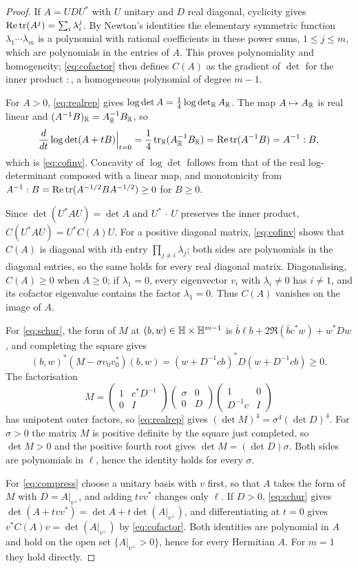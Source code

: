 \begin{proof}
If $A=UDU^*$ with $U$ unitary and $D$ real diagonal, cyclicity gives
$\operatorname{Re}\operatorname{tr}(A^j)=\sum_i\lambda_i^j$. By Newton's identities the elementary symmetric function
$\lambda_1\cdots\lambda_m$ is a polynomial with rational coefficients in these power sums,
$1\le j\le m$, which are polynomials in the entries of $A$. This proves polynomiality and
homogeneity; \eqref{eq:cofactor} then defines $C(A)$ as the gradient of $\det$ for the inner
product $:$, a homogeneous polynomial of degree $m-1$.

For $A>0$, \eqref{eq:realrep} gives $\log\det A=\frac14\log\det_{\mathbb{R}}A_{\mathbb{R}}$. The map $A\mapsto
A_{\mathbb{R}}$ is real linear and $(A^{-1}B)_{\mathbb{R}}=A_{\mathbb{R}}^{-1}B_{\mathbb{R}}$, so
\[
\frac{d}{dt}\log\det(A+tB)\Big|_{t=0}=\frac14\operatorname{tr}_{\mathbb{R}}(A_{\mathbb{R}}^{-1}B_{\mathbb{R}})=\operatorname{Re}\operatorname{tr}(A^{-1}B)=A^{-1}:B ,
\]
which is \eqref{eq:cofinv}. Concavity of $\log\det$ follows from that of the real
log-determinant composed with a linear map, and monotonicity from
$A^{-1}:B=\operatorname{Re}\operatorname{tr}(A^{-1/2}BA^{-1/2})\ge0$ for $B\ge0$.

Since $\det(U^*AU)=\det A$ and $U^*\,\cdot\,U$ preserves the inner product, $C(U^*AU)=U^*C(A)U$.
For a positive diagonal matrix, \eqref{eq:cofinv} shows that $C(A)$ is diagonal with $i$th
entry $\prod_{j\ne i}\lambda_j$; both sides are polynomials in the diagonal entries, so the same
holds for every real diagonal matrix. Diagonalising, $C(A)\ge0$ when $A\ge0$; if $\lambda_1=0$,
every eigenvector $v_i$ with $\lambda_i\ne0$ has $i\ne1$, and its cofactor eigenvalue contains the
factor $\lambda_1=0$. Thus $C(A)$ vanishes on the image of $A$.

For \eqref{eq:schur}, the form of $M$ at $(b,w)\in\mathbb{H}\times\mathbb{H}^{m-1}$ is
$\bar b\ell b+2\Re(\bar bc^*w)+w^*Dw$, and completing the square gives
\[
(b,w)^*(M-\sigma v_0v_0^*)(b,w)=(w+D^{-1}cb)^*D(w+D^{-1}cb)\ge0 .
\]
The factorisation
\[
M=\begin{pmatrix}1&c^*D^{-1}\\0&I\end{pmatrix}\begin{pmatrix}\sigma&0\\0&D\end{pmatrix}
\begin{pmatrix}1&0\\D^{-1}c&I\end{pmatrix}
\]
has unipotent outer factors, so \eqref{eq:realrep} gives $(\det M)^4=\sigma^4(\det D)^4$. For
$\sigma>0$ the matrix $M$ is positive definite by the square just completed, so $\det M>0$ and
the positive fourth root gives $\det M=(\det D)\sigma$. Both sides are polynomials in $\ell$,
hence the identity holds for every $\sigma$.

For \eqref{eq:compress} choose a unitary basis with $v$ first, so that $A$ takes the form of $M$
with $D=A|_{v^\perp}$, and adding $tvv^*$ changes only $\ell$. If $D>0$, \eqref{eq:schur} gives
$\det(A+tvv^*)=\det A+t\det(A|_{v^\perp})$, and differentiating at $t=0$ gives
$v^*C(A)v=\det(A|_{v^\perp})$ by \eqref{eq:cofactor}. Both identities are polynomial in $A$ and
hold on the open set $\{A|_{v^\perp}>0\}$, hence for every Hermitian $A$. For $m=1$ they hold
directly.
\end{proof}

